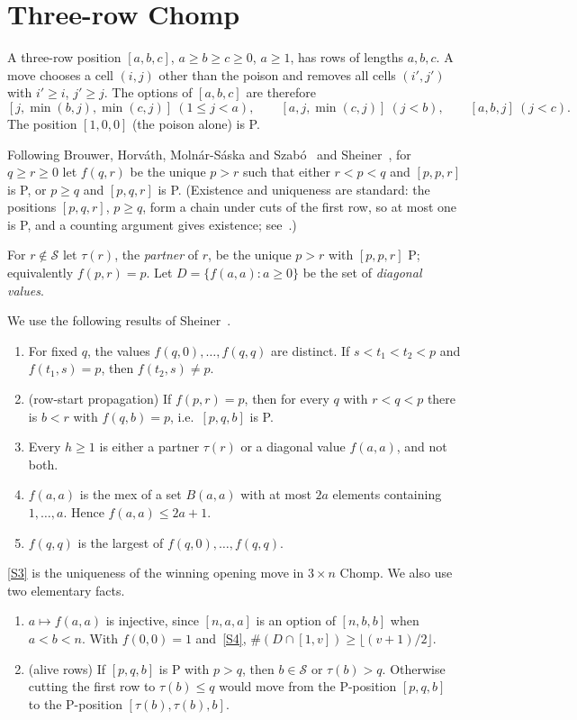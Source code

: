 \documentclass[11pt]{amsart}
\theoremstyle{definition}
\theoremstyle{remark}
\newcommand{\Sc}{\mathcal{S}}
\begin{document}
\section{Three-row Chomp}\label{sec:rows}

A three-row position $[a,b,c]$, $a\ge b\ge c\ge0$, $a\ge1$, has rows of lengths $a,b,c$. A move
chooses a cell $(i,j)$ other than the poison and removes all cells $(i',j')$ with $i'\ge i$,
$j'\ge j$. The options of $[a,b,c]$ are therefore
\[
[j,\min(b,j),\min(c,j)]\ (1\le j<a),\qquad [a,j,\min(c,j)]\ (j<b),\qquad [a,b,j]\ (j<c).
\]
The position $[1,0,0]$ (the poison alone) is P.

Following Brouwer, Horv\'ath, Moln\'ar-S\'aska and Szab\'o~\cite{BHMS} and Sheiner~\cite{Sh},
for $q\ge r\ge0$ let $f(q,r)$ be the unique $p>r$ such that either $r<p<q$ and $[p,p,r]$ is P,
or $p\ge q$ and $[p,q,r]$ is P. (Existence and uniqueness are standard: the positions
$[p,q,r]$, $p\ge q$, form a chain under cuts of the first row, so at most one is P, and a
counting argument gives existence; see~\cite{BHMS}.)

For $r\notin\Sc$ let $\tau(r)$, the \emph{partner} of $r$, be the unique $p>r$ with $[p,p,r]$ P;
equivalently $f(p,r)=p$. Let $D=\{f(a,a):a\ge0\}$ be the set of \emph{diagonal values}.

We use the following results of Sheiner~\cite{Sh}.
\begin{enumerate}[label=(S\arabic*)]
\item\label{S1} \cite[Lemma 2.3(a),(b)]{Sh} For fixed $q$, the values $f(q,0),\dots,f(q,q)$ are
  distinct. If $s<t_1<t_2<p$ and $f(t_1,s)=p$, then $f(t_2,s)\ne p$.
\item\label{S2} \cite[Lemma 4.2]{Sh} (row-start propagation) If $f(p,r)=p$, then for every $q$ with
  $r<q<p$ there is $b<r$ with $f(q,b)=p$, i.e.\ $[p,q,b]$ is P.
\item\label{S3} \cite[Props.~4.3, 4.4]{Sh} Every $h\ge1$ is either a partner $\tau(r)$ or a
  diagonal value $f(a,a)$, and not both.
\item\label{S4} \cite[Lemma 2.2]{Sh} $f(a,a)$ is the mex of a set $B(a,a)$ with at most $2a$
  elements containing $1,\dots,a$. Hence $f(a,a)\le 2a+1$.
\item\label{S5} \cite[Lemma 4.1]{Sh} $f(q,q)$ is the largest of $f(q,0),\dots,f(q,q)$.
\end{enumerate}
\ref{S3} is the uniqueness of the winning opening move in $3\times n$ Chomp. We
also use two elementary facts.
\begin{enumerate}[label=(E\arabic*)]
\item\label{E1} $a\mapsto f(a,a)$ is injective, since $[n,a,a]$ is an option of $[n,b,b]$ when
  $a<b<n$. With $f(0,0)=1$ and~\ref{S4}, $\#(D\cap[1,v])\ge\lfloor (v+1)/2\rfloor$.
\item\label{E2} (alive rows) If $[p,q,b]$ is P with $p>q$, then $b\in\Sc$ or $\tau(b)>q$.
  Otherwise cutting the first row to $\tau(b)\le q$ would move from the P-position $[p,q,b]$ to
  the P-position $[\tau(b),\tau(b),b]$.
\end{enumerate}
\end{document}
